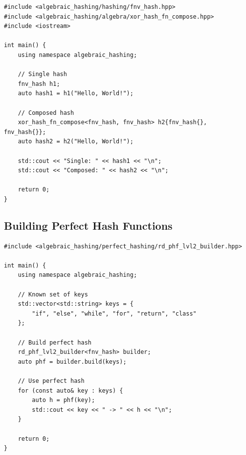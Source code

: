 \documentclass[11pt,a4paper]{article}
\theoremstyle{definition}
\begin{document}
\begin{lstlisting}[caption={Complete usage example}]
#include <algebraic_hashing/hashing/fnv_hash.hpp>
#include <algebraic_hashing/algebra/xor_hash_fn_compose.hpp>
#include <iostream>

int main() {
    using namespace algebraic_hashing;

    // Single hash
    fnv_hash h1;
    auto hash1 = h1("Hello, World!");

    // Composed hash
    xor_hash_fn_compose<fnv_hash, fnv_hash> h2{fnv_hash{}, fnv_hash{}};
    auto hash2 = h2("Hello, World!");

    std::cout << "Single: " << hash1 << "\n";
    std::cout << "Composed: " << hash2 << "\n";

    return 0;
}
\end{lstlisting}

\subsection{Building Perfect Hash Functions}

\begin{lstlisting}[caption={Perfect hash construction example}]
#include <algebraic_hashing/perfect_hashing/rd_phf_lvl2_builder.hpp>

int main() {
    using namespace algebraic_hashing;

    // Known set of keys
    std::vector<std::string> keys = {
        "if", "else", "while", "for", "return", "class"
    };

    // Build perfect hash
    rd_phf_lvl2_builder<fnv_hash> builder;
    auto phf = builder.build(keys);

    // Use perfect hash
    for (const auto& key : keys) {
        auto h = phf(key);
        std::cout << key << " -> " << h << "\n";
    }

    return 0;
}
\end{lstlisting}
\end{document}
